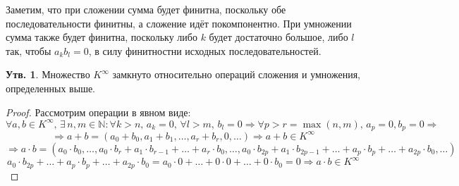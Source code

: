 \documentclass[12pt]{article}
\newcommand{\MN}{\mathbb{N}}
\theoremstyle{definition}
\newtheorem{prop}{Утв.}
\begin{document}
Заметим, что при сложении сумма будет финитна, поскольку обе последовательности финитны, а сложение идёт покомпонентно. При умножении сумма также будет финитна, поскольку либо $k$ будет достаточно большое, либо $l$ так, чтобы $a_kb_l = 0$, в силу финитностни исходных последовательностей.
\begin{prop}
	Множество $K^{\infty}$ замкнуто относительно операций сложения и умножения, определенных выше.
\end{prop}
\begin{proof}
	Рассмотрим операции в явном виде:
	$$
		\forall a,b \in K^{\infty}, \, \exists \, n,m \in \MN \colon \forall k > n, \, a_k = 0, \, \forall l > m, \, b_l = 0 \Rightarrow \forall p > r = \max(n,m), \, a_p = 0, b_p = 0 \Rightarrow
	$$
	$$
		\Rightarrow a + b = (a_0 + b_0, a_1 + b_1, \dotsc, a_r + b_r, 0 , \dotsc ) \Rightarrow a + b \in K^{\infty}
	$$
	$$
		\Rightarrow a{\cdot}b = (a_0{\cdot}b_0,  \dotsc, a_0{\cdot}b_r + a_1{\cdot} b_{r-1} + \dotsc + a_r {\cdot}b_0, \dotsc, a_0{\cdot}b_{2p} + a_1{\cdot}b_{2p -1} + \dotsc + a_p{\cdot}b_p + \dotsc + a_{2p}{\cdot}b_0, \dotsc)
	$$
	$$
		a_0{\cdot}b_{2p} +  \dotsc + a_p{\cdot}b_p + \dotsc + a_{2p}{\cdot}b_0 = a_0{\cdot}0  + \dotsc + 0{\cdot}0 + \dotsc + 0{\cdot}b_0 = 0 \Rightarrow a{\cdot}b \in K^{\infty}
	$$
\end{proof}
\end{document}

